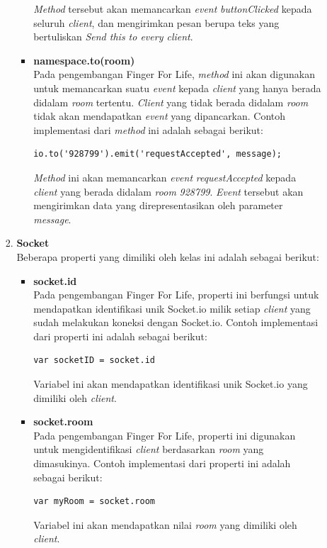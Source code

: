 \begin{enumerate}
\begin{enumerate}
\begin{enumerate}
\begin{itemize}
				\textit{Method} tersebut akan memancarkan \textit{event} \textit{buttonClicked} kepada seluruh \textit{client}, dan mengirimkan pesan berupa teks yang bertuliskan \textit{Send this to every client}.
				
				\item \textbf{namespace.to(room)} \\
				Pada pengembangan Finger For Life, \textit{method} ini akan digunakan untuk memancarkan suatu \textit{event} kepada \textit{client} yang hanya berada didalam \textit{room} tertentu. \textit{Client} yang tidak berada didalam \textit{room} tidak akan mendapatkan \textit{event} yang dipancarkan. Contoh implementasi dari \textit{method} ini adalah sebagai berikut:

\begin{lstlisting}[caption={Implementasi \textit{method .to()} }]
io.to('928799').emit('requestAccepted', message);
\end{lstlisting}
				\textit{Method} ini akan memancarkan \textit{event} \textit{requestAccepted} kepada \textit{client} yang berada didalam \textit{room} \textit{928799}. \textit{Event} tersebut akan mengirimkan data yang direpresentasikan oleh parameter \textit{message}.

			\end{itemize}
		
			\item \textbf{Socket} \\
			Beberapa properti yang dimiliki oleh kelas ini adalah sebagai berikut:
			\begin{itemize}
				\item \textbf{socket.id} \\
				Pada pengembangan Finger For Life, properti ini berfungsi untuk mendapatkan identifikasi unik Socket.io milik setiap \textit{client} yang sudah melakukan koneksi dengan Socket.io. Contoh implementasi dari properti ini adalah sebagai berikut:
\begin{lstlisting}[caption={Implementasi properti \textit{socket.id} }]
var socketID = socket.id
\end{lstlisting}
				Variabel ini akan mendapatkan identifikasi unik Socket.io yang dimiliki oleh \textit{client}. 
				
				\item \textbf{socket.room} \\
				Pada pengembangan Finger For Life, properti ini digunakan untuk mengidentifikasi \textit{client} berdasarkan \textit{room} yang dimasukinya. Contoh implementasi dari properti ini adalah sebagai berikut:
\begin{lstlisting}[caption={Implementasi properti \textit{socket.room} }]
var myRoom = socket.room
\end{lstlisting}
				Variabel ini akan mendapatkan nilai \textit{room} yang dimiliki oleh \textit{client}.


\end{itemize}
\end{enumerate}
\end{enumerate}
\end{enumerate}
